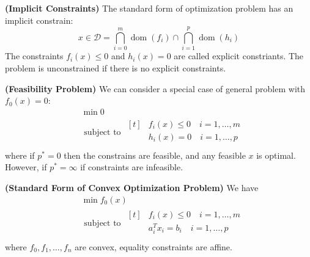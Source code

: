 \begin{definition}{\textbf{(Implicit Constraints)}}
    The standard form of optimization problem has an implicit constrain:
    \begin{equation*}
        x \in \mathcal{D} = \bigcap^m_{i=0}\operatorname{dom}(f_i) \cap \bigcap^p_{i=1} \operatorname{dom} (h_i)
    \end{equation*}
    The constraints $f_i(x)\le0$ and $h_i(x) =0$ are called explicit constriants. The problem is unconstrained if there is no explicit constraints.
\end{definition}

\begin{definition}{\textbf{(Feasibility Problem)}}
    We can consider a special case of general problem with $f_0(x) = 0$:
    \begin{equation*}
    \begin{aligned}
        &\min 0 \\
        &\text{ subject to } \begin{aligned}[t]
            &f_i(x)\le0 \quad i=1,\dots,m \\
            &h_i(x)=0 \quad i=1,\dots,p \\
        \end{aligned}
    \end{aligned}
    \end{equation*}
    where if $p^* = 0$ then the constrains are feasible, and any feasible $x$ is optimal. However, if $p^*=\infty$ if constraints are infeasible.
\end{definition}

\begin{definition}{\textbf{(Standard Form of Convex Optimization Problem)}}
    We have 
    \begin{equation*}
    \begin{aligned}
        &\min f_0(x) \\
        &\text{ subject to } \begin{aligned}[t]
            &f_i(x)\le0 \quad i=1,\dots,m \\
            &a^T_ix_i = b_i \quad i=1,\dots,p \\
        \end{aligned}
    \end{aligned}
    \end{equation*}
    where $f_0, f_1, \dots, f_n$ are convex, equality constraints are affine. 
\end{definition}

